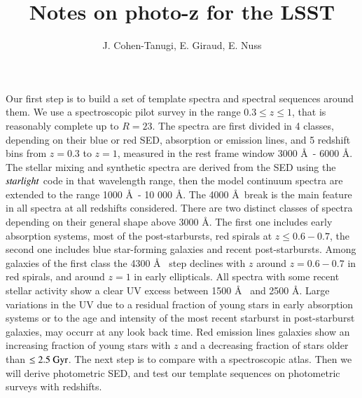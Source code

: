 \documentclass[referee]{aa}
\begin{document}
%
   \title{Notes on photo-z for the LSST}

   \author{J. Cohen-Tanugi, E. Giraud, E. Nuss
          }




   
   \date{}

 {Our first step is to 
build a set of template spectra and spectral sequences around them. We use a spectroscopic pilot survey in the range $0.3 \leq z \leq 1$, that is reasonably complete up to $R = 23$.}
{The spectra are first divided in 4 classes, depending on their blue or red SED, absorption or emission lines, and 5 redshift bins from $z = 0.3$ to $z = 1$, measured in the rest frame window 
3000 \AA ~- 6000 \AA.  The stellar mixing and synthetic spectra are derived from the SED using the $\it starlight$ code in that wavelength range, then the model continuum spectra are extended to the range 1000 \AA ~- 10 000 \AA.}
{The 4000 \AA~break is the main feature in all spectra at all redshifts considered.  
There are two distinct classes of
spectra depending on their general shape above 3000  \AA . The first one includes early absorption systems,  most
of the post-starbursts, red spirals at $z \leq 0.6-0.7$, the second one includes blue star-forming galaxies and recent
post-starbursts. Among galaxies of the first class the 4300 \AA~ step declines with $z$ around
$z = 0.6-0.7$ in red spirals, and around $z = 1$ in early ellipticals. All spectra with some recent stellar activity show a clear UV excess between 1500 \AA~ and 2500 \AA.
Large variations in the UV  due to a residual fraction of young stars in early absorption
systems or to the age and intensity of the most recent starburst in post-starburst galaxies,
may occurr at any look back time. Red emission lines galaxies show an increasing fraction of young stars with $z$ and a decreasing
fraction of stars older than $\rm \leq 2.5~ Gyr$. } 
{The next step is to compare with a spectroscopic atlas. Then we will derive photometric SED, and test our template sequences on photometric surveys with redshifts.}

           
\end{document}
